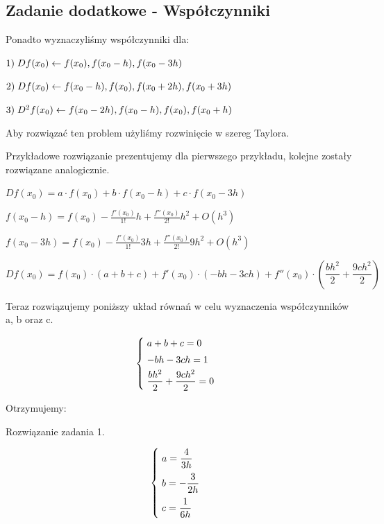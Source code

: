 \subsection{Zadanie dodatkowe - Współczynniki}
Ponadto wyznaczyliśmy współczynniki dla:

$1)\hspace{1mm}Df(x_{0}) \leftarrow f(x_{0}), f(x_{0}-h), f(x_{0}-3h) $

$2)\hspace{1mm}Df(x_{0}) \leftarrow f(x_{0}-h), f(x_{0}), f(x_{0}+2h), f(x_{0}+3h) $

$3)\hspace{1mm}D^2f(x_{0}) \leftarrow f(x_{0}-2h), f(x_{0}-h), f(x_{0}), f(x_{0}+h) $
\vspace{0.3cm}

Aby rozwiązać ten problem użyliśmy rozwinięcie w szereg Taylora.

Przykładowe rozwiązanie prezentujemy dla pierwszego przykładu, kolejne zostały rozwiązane analogicznie.

\vspace{0,5cm}

$Df(x_{0}) = a \cdot f(x_{0}) + b \cdot f(x_{0}-h) + c \cdot f(x_{0}-3h) $

$f(x_{0}-h) = f(x_{0}) - \frac{f'(x_{0})}{1!}h + \frac{f''(x_{0})}{2!}h^2 + O(h^3)$

$f(x_{0}-3h) = f(x_{0}) - \frac{f'(x_{0})}{1!}3h + \frac{f''(x_{0})}{2!}9h^2 + O(h^3)$

$Df(x_{0}) = f(x_{0}) \cdot (a+b+c) + f'(x_{0}) \cdot (-bh-3ch) + f''(x_{0}) \cdot (\dfrac{bh^2}{2} + \dfrac{9ch^2}{2}) $

Teraz rozwiązujemy poniższy układ równań w celu wyznaczenia współczynników a, b oraz c.

\[
\begin{cases}
\vspace{0.1cm} 
\hspace{0,1cm}a+b+c=0 \\
\vspace{0.1cm}
\hspace{0,1cm}-bh-3ch=1 \\
\hspace{0,1cm}\dfrac{bh^2}{2} + \dfrac{9ch^2}{2}=0
\end{cases}
\]

Otrzymujemy:

Rozwiązanie zadania 1.

\[
\begin{cases}
\vspace{0.2cm} 
\hspace{0,1cm}a=\dfrac{4}{3h} \\
\vspace{0.2cm}
\hspace{0,1cm}b=-\dfrac{3}{2h} \\
\hspace{0,1cm}c=\dfrac{1}{6h}
\end{cases}
\]

